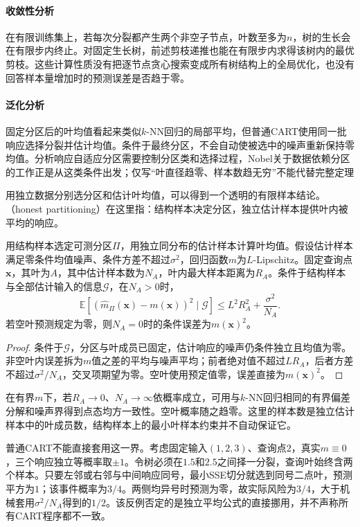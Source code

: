 \paragraph{收敛性分析}
在有限训练集上，若每次分裂都产生两个非空子节点，叶数至多为$n$，树的生长会在有限步内终止。对固定生长树，前述剪枝递推也能在有限步内求得该树内的最优剪枝。这些计算性质没有把逐节点贪心搜索变成所有树结构上的全局优化，也没有回答样本量增加时的预测误差是否趋于零。

\paragraph{泛化分析}
固定分区后的叶均值看起来类似$k$-NN回归的局部平均，但普通CART使用同一批响应选择分裂并估计均值。条件于最终分区，不会自动使被选中的噪声重新保持零均值。分析响应自适应分区需要控制分区类和选择过程，Nobel关于数据依赖分区的工作正是从这类条件出发；仅写“叶直径趋零、样本数趋无穷”不能代替完整定理

用独立数据分别选分区和估计叶均值，可以得到一个透明的有限样本结论。（honest partitioning）在这里指：结构样本决定分区，独立估计样本提供叶内被平均的响应。

\begin{theorem}[独立分区下的叶平均误差]
  \label{thm:regression-honest-tree}
  用结构样本选定可测分区$\Pi$，用独立同分布的估计样本计算叶均值。假设估计样本满足零条件均值噪声、条件方差不超过$\sigma^2$，回归函数$m$为$L$-Lipschitz。固定查询点$\bm{x}$，其叶为$A$，其中估计样本数为$N_A$，叶内最大样本距离为$R_A$。条件于结构样本与全部估计输入的信息$\mathcal G$，在$N_A>0$时，
  \[
    \mathbb{E}[(\widehat m_\Pi(\bm{x})-m(\bm{x}))^2\mid\mathcal G]
    \leq L^2R_A^2+\frac{\sigma^2}{N_A}.
  \]
  若空叶预测规定为零，则$N_A=0$时的条件误差为$m(\bm{x})^2$。
\end{theorem}

\begin{proof}
条件于$\mathcal G$，分区与叶成员已固定，估计响应的噪声仍条件独立且均值为零。非空叶内误差拆为$m$值之差的平均与噪声平均；前者绝对值不超过$LR_A$，后者方差不超过$\sigma^2/N_A$，交叉项期望为零。空叶使用预定值零，误差直接为$m(\bm{x})^2$。
\end{proof}

在有界$m$下，若$R_A\to0$、$N_A\to\infty$依概率成立，可用与$k$-NN回归相同的有界偏差分解和噪声界得到点态均方一致性。空叶概率随之趋零。这里的样本数是独立估计样本中的叶成员数，结构样本上的最小叶样本约束并不自动保证它。

普通CART不能直接套用这一界。考虑固定输入$(1,2,3)$、查询点$2$，真实$m\equiv0$，三个响应独立等概率取$\pm1$。令树必须在$1.5$和$2.5$之间择一分裂，查询叶始终含两个样本。只要左邻或右邻与中间响应同号，最小SSE切分就选到同号二点叶，预测平方为$1$；该事件概率为$3/4$。两侧均异号时预测为零，故实际风险为$3/4$，大于机械套用$\sigma^2/N_A$得到的$1/2$。该反例否定的是独立平均公式的直接挪用，并不声称所有CART程序都不一致。

